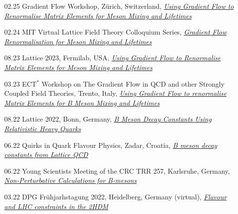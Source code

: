 \documentclass[10pt]{article} %
\begin{document}
\begin{paracol}{2}
\begin{itemize}[noitemsep,topsep=1pt,label=]
    \item [02.25] Gradient Flow Workshop, Z\"urich, Switzerland, \href{https://indico.psi.ch/event/16749/contributions/55137/}{\it Using Gradient Flow to Renormalise Matrix Elements for Meson Mixing and Lifetimes}
    \item [02.24] MIT Virtual Lattice Field Theory Colloquium Series, \href{http://ctp.lns.mit.edu/latticecolloq/}{\it Gradient Flow Renormalisation for Meson Mixing and Lifetimes}
    \item [08.23] Lattice 2023, Fermilab, USA, \href{https://indico.fnal.gov/event/57249/contributions/268344/}{\it Using Gradient Flow to Renormalise Matrix Elements for Meson Mixing and Lifetimes}
    \item [03.23] ECT$^*$ Workshop on The Gradient Flow in QCD and other Strongly Coupled Field Theories, Trento, Italy, \href{https://indico.ectstar.eu/event/164/contributions/3524/}{\it Using Gradient Flow to renormalise Matrix Elements for B Meson Mixing and Lifetimes}
    \item [08.22] Lattice 2022, Bonn, Germany, \href{https://indico.hiskp.uni-bonn.de/event/40/contributions/680/}{\it B Meson Decay Constants Using Relativistic Heavy Quarks}
    \item [06.22] Quirks in Quark Flavour Physics, Zadar, Croatia, \href{https://indico.ph.tum.de/event/6994/contributions/5251/}{\it B meson decay constants from Lattice QCD}
    \item [06.22] Young Scientists Meeting of the CRC TRR 257, Karlsruhe, Germany, \href{https://indico.scc.kit.edu/event/2690/contributions/10446/}{\it Non-Perturbative Calculations for B-mesons}
    \item [03.22] DPG Fr\"uhjarhstagung 2022, Heidelberg, Germany (virtual), \href{https://www.dpg-verhandlungen.de/year/2022/conference/heidelberg/part/t/session/85/contribution/2}{\it Flavour and LHC constraints in the 2HDM}
\end{itemize}

\pagebreak


\end{paracol}
\end{document}
